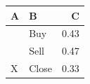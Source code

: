 \documentclass{article}
\begin{document}
\begin{tabular}{llr}
\hline
A & B & C \\
\hline
&Buy & 0.43 \\
&Sell & 0.47 \\
X &Close & 0.33 \\
\end{tabular}
\end{document}

